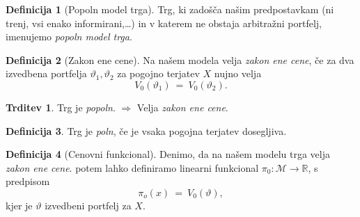 \documentclass[11pt]{article}
\newcommand{\R}{\mathbb{R}}
\newcommand{\M}{\mathcal{M}}
\newcommand{\1}{\mathbbm{1}}
\theoremstyle{definition}
\newtheorem{definicija}{Definicija}[section]
\theoremstyle{definition}
\newtheorem{trditev}{Trditev}[section]
\begin{document}
\begin{definicija}[Popoln model trga]

Trg, ki zadošča našim predpostavkam (ni trenj, vsi enako informirani,\ldots) in v katerem ne obstaja arbitražni portfelj, imenujemo \textit{popoln model trga}. 

\end{definicija}
\vspace{0.5cm}

\begin{definicija}[Zakon ene cene]

Na našem modela velja \textit{zakon ene cene}, če za dva izvedbena portfelja $\vartheta_1, \vartheta_2$ za pogojno terjatev $X$ nujno velja
$$V_0(\vartheta_1) ~=~ V_0(\vartheta_2).$$

\end{definicija}
\vspace{0.5cm}

\begin{trditev}

Trg je \textit{popoln}. $\Longrightarrow$ Velja \textit{zakon ene cene}.

\end{trditev}
\vspace{0.5cm}

\begin{definicija}

Trg je \textit{poln}, če je vsaka pogojna terjatev dosegljiva.

\end{definicija}
\vspace{0.5cm}

\begin{definicija}[Cenovni funkcional]

Denimo, da na našem modelu trga velja \textit{zakon ene cene}. potem lahko definiramo linearni funkcional \hbox{$\pi_0: \M \rightarrow \R$}, s predpisom 
$$\pi_o(x) ~=~ V_0(\vartheta),$$
kjer je $\vartheta$ izvedbeni portfelj za $X$.

\end{definicija}
\vspace{0.5cm}

\pagebreak
\end{document}
